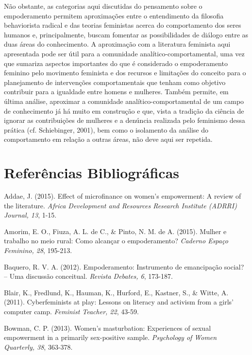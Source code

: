 Não obstante, as categorias aqui discutidas do pensamento sobre o empoderamento permitem aproximações entre o entendimento da filosofia behaviorista radical e das teorias feministas acerca do comportamento dos seres humanos e, principalmente, buscam fomentar as possibilidades de diálogo entre as duas áreas do conhecimento. A aproximação com a literatura feminista aqui apresentada pode ser útil para a comunidade analítico-comportamental, uma vez que sumariza aspectos importantes do que é considerado o empoderamento feminino pelo movimento feminista e dos recursos e limitações do conceito para o planejamento de intervenções comportamentais que tenham como objetivo contribuir para a igualdade entre homens e mulheres. Também permite, em última análise, aproximar a comunidade analítico-comportamental de um campo de conhecimento já há muito em construção e que, vista a tradição da ciência de ignorar as contribuições de mulheres e a denúncia realizada pelo feminismo dessa prática (cf. Schiebinger, 2001), bem como o isolamento da análise do comportamento em relação a outras áreas, não deve aqui ser repetida.
\vfill
\pagebreak
\section*{Referências Bibliográficas}

\hangindent=25pt
\noindent Addae, J. (2015). Effect of microfinance on women's empowerment: A review of the literature. \textit{Africa Development and Resources Research Institute (ADRRI) Journal, 13}, 1-15.

\hangindent=25pt
\noindent Amorim, E. O., Fiuza, A. L. de C., \& Pinto, N. M. de A. (2015). Mulher e trabalho no meio rural: Como alcançar o empoderamento? \textit{Caderno Espaço Feminino, 28}, 195-213.

\hangindent=25pt
\noindent Baquero, R. V. A. (2012). Empoderamento: Instrumento de emancipação social? – Uma discussão conceitual. \textit{Revista Debates, 6}, 173-187.

\hangindent=25pt
\noindent Blair, K., Fredlund, K., Hauman, K., Hurford, E., Kastner, S., \& Witte, A. (2011). Cyberfeminists at play: Lessons on literacy and activism from a girls’ computer camp. \textit{Feminist Teacher, 22}, 43-59.

\hangindent=25pt
\noindent Bowman, C. P. (2013). Women’s masturbation: Experiences of sexual empowerment in a primarily sex-positive sample. \textit{Psychology of Women Quarterly, 38}, 363-378.


